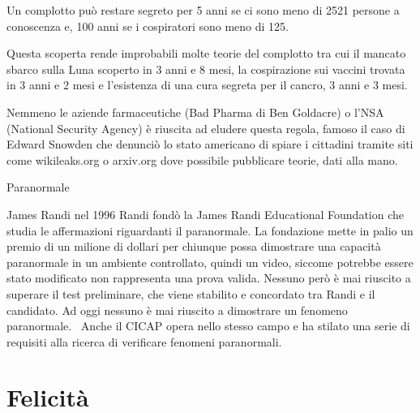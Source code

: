 \documentclass[12pt]{book} %
\begin{document}
\begin{mdframed}[linewidth=1pt]
Un complotto può restare segreto per 5 anni se ci sono meno di 2521 persone a conoscenza e, 100 anni se i cospiratori
sono meno di 125.

Questa scoperta rende improbabili molte teorie del complotto tra cui il mancato sbarco sulla Luna scoperto in 3 anni e 8
mesi, la cospirazione sui vaccini trovata in 3 anni e 2 mesi e l'esistenza di una cura segreta per
il cancro, 3 anni e 3 mesi.

Nemmeno le aziende farmaceutiche (Bad Pharma di Ben
Goldacre) o
l'NSA (National Security Agency) è riuscita ad eludere questa regola, famoso il caso di Edward
Snowden che denunciò lo stato americano di spiare i cittadini tramite siti come wikileaks.org o arxiv.org dove
possibile pubblicare teorie, dati alla mano.


\bigskip

Paranormale

James Randi nel 1996 Randi fondò la James Randi Educational Foundation che studia le
affermazioni riguardanti il paranormale. La fondazione mette in palio un premio di un milione di dollari per chiunque
possa dimostrare una capacità paranormale in un ambiente controllato, quindi un video, siccome potrebbe essere stato
modificato non rappresenta una prova valida. Nessuno però è mai riuscito a superare il test preliminare, che viene
stabilito e concordato tra Randi e il candidato. Ad oggi nessuno è mai riuscito a dimostrare un fenomeno paranormale.
\ Anche il CICAP opera nello stesso campo e ha stilato una serie di
requisiti alla ricerca di verificare fenomeni paranormali.
\end{mdframed}

\bigskip


\bigskip

\clearpage\section{Felicità}
\end{document}
